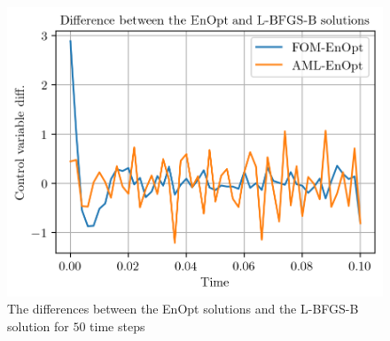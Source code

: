 \begin{figure}
\centering
\includegraphics{Plots/solutionsDifferLBFGSBNT50.png}
\caption{\label{solutionsDifferLBFGSBNT50}The differences between the EnOpt solutions and the L-BFGS-B solution for $50$ time steps}
\end{figure}